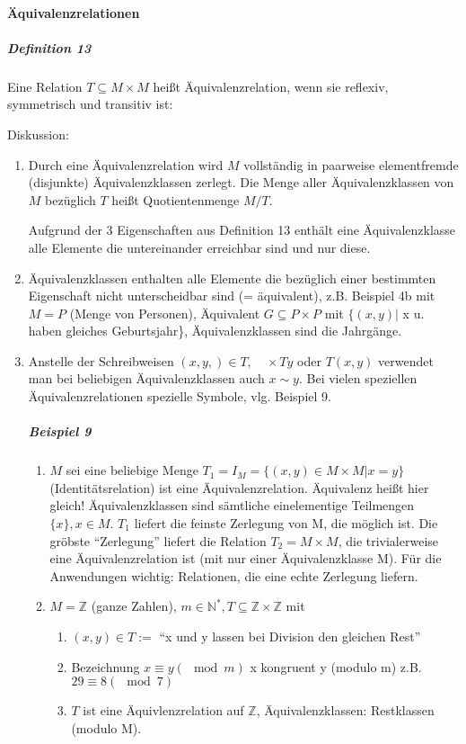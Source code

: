 \documentclass[a4paper]{scrartcl}
\begin{document}
\paragraph{Äquivalenzrelationen}
\subparagraph{Definition 13}
Eine Relation $T \subseteq M \times M$ heißt Äquivalenzrelation, wenn sie reflexiv, symmetrisch und transitiv ist:

Diskussion:
\begin{enumerate}
\item Durch eine Äquivalenzrelation wird $M$ vollständig in paarweise elementfremde (disjunkte) Äquivalenzklassen zerlegt. Die Menge aller Äquivalenzklassen von $M$ bezüglich $T$ heißt Quotientenmenge $M/T$.

Aufgrund der 3 Eigenschaften aus Definition 13 enthält eine Äquivalenzklasse alle Elemente die untereinander erreichbar sind und nur diese.

\item Äquivalenzklassen enthalten alle Elemente die bezüglich einer bestimmten Eigenschaft nicht unterscheidbar sind (= äquivalent), z.B. Beispiel 4b mit $M=P$ (Menge von Personen), Äquivalent $G \subseteq P \times P$ mit $\{ (x,y) |$ x u. haben gleiches Geburtsjahr\}, Äquivalenzklassen sind die Jahrgänge.

\item Anstelle der Schreibweisen $(x,y,)\in T, \quad \times T y$ oder $T(x,y)$ verwendet man bei beliebigen Äquivalenzklassen auch $x \sim y$. Bei vielen speziellen Äquivalenzrelationen spezielle Symbole, vlg. Beispiel 9.

\subparagraph{Beispiel 9}\label{Bsp9}
\begin{enumerate}
\item $M$ sei eine beliebige Menge $T_1 = I_M = \{ (x,y) \in M \times M | x=y\}$ (Identitätsrelation) ist eine Äquivalenzrelation. Äquivalenz heißt hier gleich!
Äquivalenzklassen sind sämtliche einelementige Teilmengen $\{x\} , x \in M$. $T_1$ liefert die feinste Zerlegung von M, die möglich ist. Die gröbste "`Zerlegung"' liefert die Relation $T_2 = M \times M$, die trivialerweise eine Äquivalenzrelation ist (mit nur einer Äquivalenzklasse M). Für die Anwendungen wichtig: Relationen, die eine echte Zerlegung liefern.

\item $M= \mathbb{Z}$ (ganze Zahlen), $m \in \mathbb{N}^*, T \subseteq \mathbb{Z} \times \mathbb{Z}$ mit
\begin {enumerate}
\item $(x,y) \in T :=$ "`x und y lassen bei Division den gleichen Rest"'
\item Bezeichnung $x \equiv y (\mod{m})$ x kongruent y (modulo m)
z.B. $29 \equiv 8 (\mod{7})$
\item $T$ ist eine Äquivlenzrelation auf $\mathbb{Z}$, Äquivalenzklassen: Restklassen (modulo M).
\end{enumerate}


\end{enumerate}
\end{enumerate}
\end{document}
